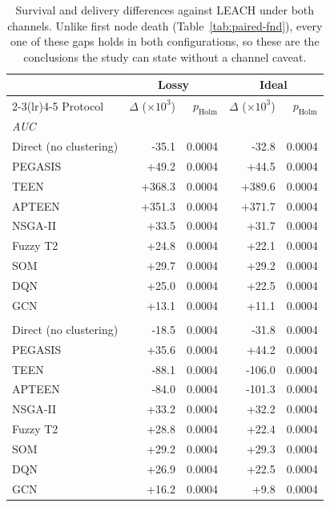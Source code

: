 \begin{table}[!t]
\caption{Survival and delivery differences against LEACH under both channels. Unlike first node death (Table~\ref{tab:paired-fnd}), every one of these gaps holds in both configurations, so these are the conclusions the study can state without a channel caveat.}
\label{tab:paired-robust}
\centering
\begin{tabular}{lrrrr}
\toprule
& \multicolumn{2}{c}{Lossy} & \multicolumn{2}{c}{Ideal} \\
\cmidrule(lr){2-3}\cmidrule(lr){4-5}
Protocol & $\Delta$ ($\times 10^3$) & $p_{\mathrm{Holm}}$ & $\Delta$ ($\times 10^3$) & $p_{\mathrm{Holm}}$ \\
\midrule
\multicolumn{5}{l}{\textit{AUC}} \\
\quad Direct (no clustering) & -35.1 & 0.0004 & -32.8 & 0.0004 \\
\quad PEGASIS & +49.2 & 0.0004 & +44.5 & 0.0004 \\
\quad TEEN & +368.3 & 0.0004 & +389.6 & 0.0004 \\
\quad APTEEN & +351.3 & 0.0004 & +371.7 & 0.0004 \\
\quad NSGA-II & +33.5 & 0.0004 & +31.7 & 0.0004 \\
\quad Fuzzy T2 & +24.8 & 0.0004 & +22.1 & 0.0004 \\
\quad SOM & +29.7 & 0.0004 & +29.2 & 0.0004 \\
\quad DQN & +25.0 & 0.0004 & +22.5 & 0.0004 \\
\quad GCN & +13.1 & 0.0004 & +11.1 & 0.0004 \\
\addlinespace
\multicolumn{5}{l}{\textit{Readings}} \\
\quad Direct (no clustering) & -18.5 & 0.0004 & -31.8 & 0.0004 \\
\quad PEGASIS & +35.6 & 0.0004 & +44.2 & 0.0004 \\
\quad TEEN & -88.1 & 0.0004 & -106.0 & 0.0004 \\
\quad APTEEN & -84.0 & 0.0004 & -101.3 & 0.0004 \\
\quad NSGA-II & +33.2 & 0.0004 & +32.2 & 0.0004 \\
\quad Fuzzy T2 & +28.8 & 0.0004 & +22.4 & 0.0004 \\
\quad SOM & +29.2 & 0.0004 & +29.3 & 0.0004 \\
\quad DQN & +26.9 & 0.0004 & +22.5 & 0.0004 \\
\quad GCN & +16.2 & 0.0004 & +9.8 & 0.0004 \\
\bottomrule
\end{tabular}
\end{table}
